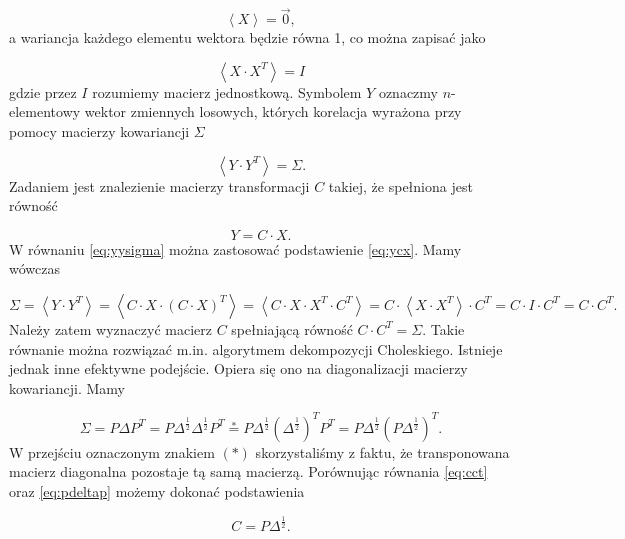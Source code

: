 \documentclass[11pt,titlepage]{article}
\numberwithin{equation}{section}
\begin{document}
\begin{equation}
\left \langle X \right \rangle = \vec{0},
\end{equation} 
a wariancja każdego elementu wektora będzie równa 1, co można zapisać jako


\begin{equation}
\left \langle X \cdot X^T \right \rangle = I
\end{equation} 
gdzie przez $I$ rozumiemy macierz jednostkową. Symbolem $Y$ oznaczmy $n$-elementowy wektor zmiennych losowych, których korelacja wyrażona przy pomocy macierzy kowariancji $\Sigma$


\begin{equation}\label{eq:yysigma}
\left \langle Y \cdot Y^T \right \rangle = \Sigma.
\end{equation} 
Zadaniem jest znalezienie macierzy transformacji $C$ takiej, że spełniona jest równość

\begin{equation}\label{eq:ycx}
Y=C \cdot X.
\end{equation} 
W równaniu \eqref{eq:yysigma} można zastosować podstawienie \eqref{eq:ycx}. Mamy wówczas

\begin{equation}\label{eq:cct}
\Sigma = \left \langle Y \cdot Y^T \right \rangle = \left \langle C \cdot X \cdot (C \cdot X)^T \right \rangle =
\left \langle C \cdot X \cdot X^T \cdot C^T \right \rangle =  C \cdot \left \langle X \cdot X^T \right \rangle \cdot C^T =
C \cdot I \cdot C^T = C \cdot C^T.
\end{equation} 
Należy zatem wyznaczyć macierz $C$ spełniającą równość $C \cdot C^T = \Sigma$. Takie równanie można rozwiązać m.in. algorytmem dekompozycji Choleskiego. Istnieje jednak inne efektywne podejście. Opiera się ono na diagonalizacji macierzy kowariancji. Mamy 

\begin{equation}\label{eq:pdeltap}
\Sigma=P\Delta P^T=P \Delta^{\frac{1}{2}} \Delta^{\frac{1}{2}} P^T \stackrel{*}{=}
P   \Delta^{\frac{1}{2}}  (\Delta^{\frac{1}{2}})^T   P^T =
P   \Delta^{\frac{1}{2}}  ( P   \Delta^{\frac{1}{2}} )^T.
\end{equation} 
W przejściu oznaczonym znakiem $(*)$ skorzystaliśmy z faktu, że transponowana macierz diagonalna pozostaje tą samą macierzą. Porównując równania \eqref{eq:cct} oraz \eqref{eq:pdeltap} możemy dokonać podstawienia


\begin{equation}\label{eq:cpdeltafrac}
C  =P  \Delta^{\frac{1}{2}}.
\end{equation} 
\end{document}
